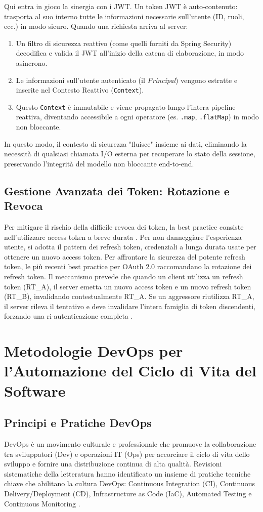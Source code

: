 \documentclass[12pt,a4paper,openright,twoside]{book}
\begin{document}
Qui entra in gioco la sinergia con i JWT. Un token JWT è auto-contenuto: trasporta al suo interno tutte le informazioni necessarie sull'utente (ID, ruoli, ecc.) in modo sicuro. Quando una richiesta arriva al server:
\begin{enumerate}
    \item Un filtro di sicurezza reattivo (come quelli forniti da Spring Security) decodifica e valida il JWT all'inizio della catena di elaborazione, in modo asincrono.
    \item Le informazioni sull'utente autenticato (il \textit{Principal}) vengono estratte e inserite nel Contesto Reattivo (\texttt{Context}).
    \item Questo \texttt{Context} è immutabile e viene propagato lungo l'intera pipeline reattiva, diventando accessibile a ogni operatore (es. \texttt{.map}, \texttt{.flatMap}) in modo non bloccante.
\end{enumerate}
In questo modo, il contesto di sicurezza "fluisce" insieme ai dati, eliminando la necessità di qualsiasi chiamata I/O esterna per recuperare lo stato della sessione, preservando l'integrità del modello non bloccante end-to-end.

\subsection{Gestione Avanzata dei Token: Rotazione e Revoca}
Per mitigare il rischio della difficile revoca dei token, la best practice consiste nell'utilizzare access token a breve durata \cite{flanagan2024token}. Per non danneggiare l'esperienza utente, si adotta il pattern dei refresh token, credenziali a lunga durata usate per ottenere un nuovo access token. Per affrontare la sicurezza del potente refresh token, le più recenti best practice per OAuth 2.0 raccomandano la rotazione dei refresh token. Il meccanismo prevede che quando un client utilizza un refresh token (RT\_A), il server emetta un nuovo access token e un nuovo refresh token (RT\_B), invalidando contestualmente RT\_A. Se un aggressore riutilizza RT\_A, il server rileva il tentativo e deve invalidare l'intera famiglia di token discendenti, forzando una ri-autenticazione completa \cite{flanagan2024token}.

\section{Metodologie DevOps per l'Automazione del Ciclo di Vita del Software}

\subsection{Principi e Pratiche DevOps}
DevOps è un movimento culturale e professionale che promuove la collaborazione tra sviluppatori (Dev) e operazioni IT (Ops) per accorciare il ciclo di vita dello sviluppo e fornire una distribuzione continua di alta qualità. Revisioni sistematiche della letteratura hanno identificato un insieme di pratiche tecniche chiave che abilitano la cultura DevOps: Continuous Integration (CI), Continuous Delivery/Deployment (CD), Infrastructure as Code (IaC), Automated Testing e Continuous Monitoring \cite{teixeira2020systematic}.
\end{document}
